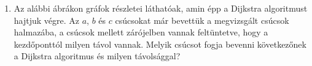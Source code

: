 \documentclass[a4paper,12pt]{article}
\begin{document}
\begin{enumerate}
        
        
        \item Az alábbi ábrákon gráfok részletei láthatóak, amin épp a Dijkstra algoritmust hajtjuk végre. Az $a$, $b$ és $c$ csúcsokat már bevettük a megvizsgált csúcsok halmazába, a csúcsok mellett zárójelben vannak feltüntetve, hogy a kezdőponttól milyen távol vannak. Melyik csúcsot fogja bevenni következőnek a Dijkstra algoritmus és milyen távolsággal?
        \begin{figure}[!h]
            \centering
            \begin{subfigure}{0.24\textwidth}
                \centering
                
            \end{subfigure}
            \begin{subfigure}{0.24\textwidth}
                \centering
                
            \end{subfigure}
            \begin{subfigure}{0.24\textwidth}
                \centering
                
            \end{subfigure}
            \begin{subfigure}{0.24\textwidth}
                \centering
                
            \end{subfigure}
        \end{figure}


\end{enumerate}
\end{document}
